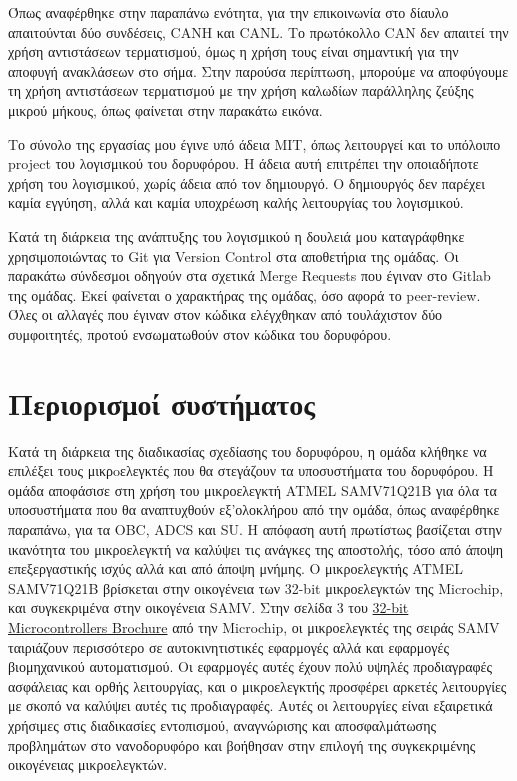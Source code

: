 \documentclass[a4paper,nobib,justified]{tufte-book}
\begin{document}
Όπως αναφέρθηκε στην παραπάνω ενότητα, για την επικοινωνία στο δίαυλο απαιτούνται δύο συνδέσεις, CANH και CANL. Το πρωτόκολλο CAN δεν απαιτεί την χρήση αντιστάσεων τερματισμού, όμως η χρήση τους είναι σημαντική για την αποφυγή ανακλάσεων στο σήμα. Στην παρούσα περίπτωση, μπορούμε να αποφύγουμε τη χρήση αντιστάσεων τερματισμού με την χρήση καλωδίων παράλληλης ζεύξης μικρού μήκους, όπως φαίνεται στην παρακάτω εικόνα.

Το σύνολο της εργασίας μου έγινε υπό άδεια MIT, όπως λειτουργεί και το υπόλοιπο project του λογισμικού του δορυφόρου. Η άδεια αυτή επιτρέπει την οποιαδήποτε χρήση του λογισμικού, χωρίς άδεια από τον δημιουργό. Ο δημιουργός δεν παρέχει καμία εγγύηση, αλλά και καμία υποχρέωση καλής λειτουργίας του λογισμικού. 

Κατά τη διάρκεια της ανάπτυξης του λογισμικού η δουλειά μου καταγράφθηκε χρησιμοποιώντας το Git για Version Control στα αποθετήρια της ομάδας. Οι παρακάτω σύνδεσμοι οδηγούν στα σχετικά Merge Requests που έγιναν στο Gitlab της ομάδας. Εκεί φαίνεται ο χαρακτήρας της ομάδας, όσο αφορά το peer-review. Όλες οι αλλαγές που έγιναν στον κώδικα ελέγχθηκαν από τουλάχιστον δύο συμφοιτητές, προτού ενσωματωθούν στον κώδικα του δορυφόρου. 

\section{Περιορισμοί συστήματος}

Κατά τη διάρκεια της διαδικασίας σχεδίασης του δορυφόρου, η ομάδα κλήθηκε να επιλέξει τους μικρoελεγκτές που θα στεγάζουν τα υποσυστήματα του δορυφόρου. Η ομάδα αποφάσισε στη χρήση του μικροελεγκτή ATMEL SAMV71Q21B για όλα τα υποσυστήματα που θα αναπτυχθούν εξ'ολοκλήρου από την ομάδα, όπως αναφέρθηκε παραπάνω, για τα OBC, ADCS και SU. Η απόφαση αυτή πρωτίστως βασίζεται στην ικανότητα του μικροελεγκτή να καλύψει τις ανάγκες της αποστολής, τόσο από άποψη επεξεργαστικής ισχύς αλλά και από άποψη μνήμης. Ο μικροελεγκτής ATMEL SAMV71Q21B βρίσκεται στην οικογένεια των 32-bit μικροελεγκτών της Microchip, και συγκεκριμένα στην οικογένεια SAMV. Στην σελίδα 3 του \href{https://ww1.microchip.com/downloads/en/DeviceDoc/30009904V.pdf}{32-bit Microcontrollers Brochure} από την Microchip, οι μικροελεγκτές της σειράς SAMV ταιριάζουν περισσότερο σε αυτοκινητιστικές εφαρμογές αλλά και εφαρμογές βιομηχανικού αυτοματισμού. Οι εφαρμογές αυτές έχουν πολύ υψηλές προδιαγραφές ασφάλειας και ορθής λειτουργίας, και ο μικροελεγκτής προσφέρει αρκετές λειτουργίες με σκοπό να καλύψει αυτές τις προδιαγραφές. Αυτές οι λειτουργίες είναι εξαιρετικά χρήσιμες στις διαδικασίες εντοπισμού, αναγνώρισης και αποσφαλμάτωσης προβλημάτων στο νανοδορυφόρο και βοήθησαν στην επιλογή της συγκεκριμένης οικογένειας μικροελεγκτών.
\end{document}
